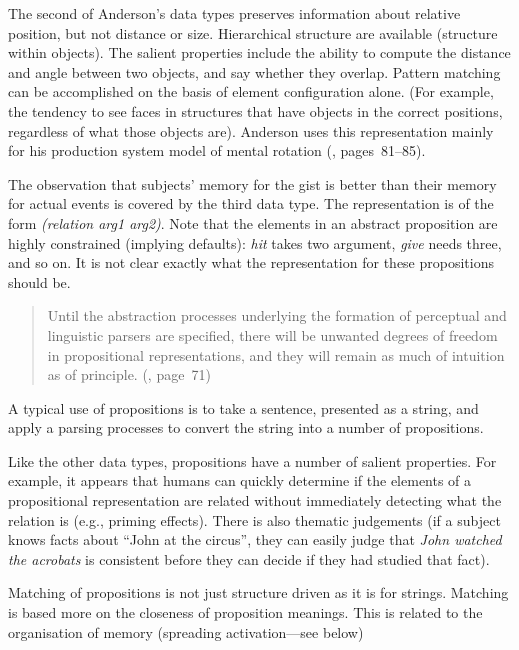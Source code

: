  The second of Anderson's data types preserves
information about relative position, but not distance or size. 
Hierarchical structure are available (structure within objects). The
salient properties include the ability to compute the distance and
angle between two objects, and say whether they overlap.  Pattern
matching can be accomplished on the basis of element configuration
alone. (For example, the tendency to see faces in structures that have
objects in the correct positions, regardless of what those objects are).
Anderson uses this representation mainly for his production system 
model of mental rotation (, pages~81--85).

  The observation that 
subjects' memory for the gist is better than their memory for
actual events is covered by the third data type.  
The representation is of the form {\em(relation arg1 arg2)}.
Note that the elements in an abstract proposition are highly
constrained (implying defaults): {\em hit\/} takes two argument,
{\em give} needs three,
and so on.  It is not clear exactly what the representation for
these propositions should be.
\begin{quotation}\small
Until the abstraction processes underlying the formation of
perceptual and linguistic parsers are specified, there will be
unwanted degrees of freedom in propositional representations, and
they will remain as much of intuition as of principle.
\flushright (, page~71)
\end{quotation}

A typical use of propositions is to take a sentence, presented as
a string, and apply a parsing processes to convert the string into a 
number of propositions.   

Like the other data types, propositions have a number of
salient properties. For example, it appears that humans can
quickly determine
if the elements of a propositional representation are related without
immediately detecting what the relation is (e.g., priming effects). 
There is also thematic judgements (if a subject knows facts about
``John at the circus'',  they
can easily judge that {\em John watched the acrobats} is consistent
before they can decide if they had studied that fact).

Matching of propositions is not just structure driven as it is
for strings.  Matching is based more on the closeness of proposition
meanings.  This is related to the organisation of memory (spreading 
activation---see below)

